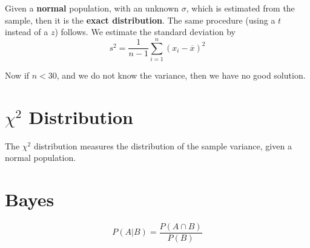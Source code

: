 \documentclass[12pt]{article}
\begin{document}
Given a \textbf{normal} population, with an unknown $\sigma$, which is estimated from the sample, then it is the \textbf{exact distribution}. The same procedure (using a $t$ instead of a $z$) follows. We estimate the standard deviation by
$$s^2 = \frac{1}{n-1}\sum_{i=1}^n (x_i-\overline x)^2$$

Now if $n < 30$, and we do not know the variance, then we have no good solution.

\section{$\chi^2$ Distribution}

The $\chi^2$ distribution measures the distribution of the sample variance, given a normal population. 

\section{Bayes}

$$P(A|B) = \frac{P(A\cap B)}{P(B)}$$
\end{document}
